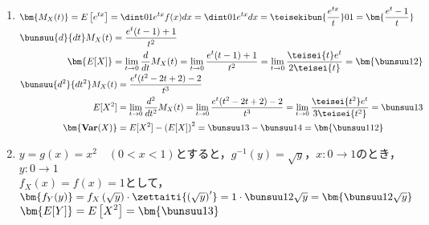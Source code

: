 \documentclass[b5paper]{jlreq}  %
\begin{document}
\begin{enumerate}[(1)\hspace{5mm}]
    \item $\begin{aligned}
        \bm{M_X(t)}&=E\left[e^{tx}\right]
        =\dint01e^{tx}f(x)dx
        =\dint01e^{tx}dx
        =\teisekibun{\dfrac{e^{tx}}{t}}01
        =\bm{\dfrac{e^t-1}t}\end{aligned}$\\
    
    
        
    
    
    $\begin{aligned}
        \bunsuu{d}{dt}M_X(t)&
        =\dfrac{e^t(t-1)+1}{t^2}\\
        \bm{E[X]}&=\lim_{t\to0}\dfrac{d}{dt}M_X(t)
        =\lim_{t\to0}\dfrac{e^t(t-1)+1}{t^2}
        =\lim_{t\to0}\dfrac{\teisei{t}e^t}{2\teisei{t}}
        =\bm{\bunsuu12}
    \end{aligned}$\\
        
    
    
    
    
    $\begin{aligned}
        \bunsuu{d^2}{dt^2}M_X(t)&
        =\dfrac{e^t(t^2-2t+2)-2}{t^3}\\
        E[X^2]&=\lim_{t\to0}\dfrac{d^2}{dt^2}M_X(t)
        =\lim_{t\to0}\dfrac{e^t(t^2-2t+2)-2}{t^3}
        =\lim_{t\to0}\dfrac{\teisei{t^2}e^t}{3\teisei{t^2}}
        =\bunsuu13\\
        \bm{\textbf{Var}(X)}&=E[X^2]-\left(E[X]\right)^2
        =\bunsuu13-\bunsuu14=\bm{\bunsuu1{12}}
    \end{aligned}$\\


    \item $y=g(x)=x^2\quad(0<x<1)$とすると，$g^{-1}(y)=\sqrt y$，$x:0\to 1$のとき，$y:0\to 1$\\
    
    $f_X(x)=f(x)=1$として，\\

    $\begin{aligned}
        \bm{f_Y(y)}&=f_X\left(\sqrt y\right)\cdot\zettaiti{\left(\sqrt y\right)'}
        =1\cdot\bunsuu1{2\sqrt y}=\bm{\bunsuu1{2\sqrt y}}\end{aligned}$\\
    
    
    $\begin{aligned}
        \bm{E[Y]}&=E\left[X^2\right]
        =\bm{\bunsuu13}\end{aligned}$\\




\end{enumerate}
\end{document}
